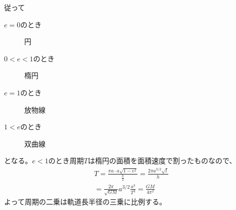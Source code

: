 	従って
	\begin{description}
		\item[$e = 0$のとき] 円
		\item[$0 < e < 1$のとき] 楕円
		\item[$e = 1$のとき] 放物線
		\item[$1 < e$のとき] 双曲線
	\end{description}
	となる。$e < 1$のとき周期$T$は楕円の面積を面積速度で割ったものなので、
	\begin{align}
		T = \frac{\pi a \cdot a\sqrt{1 - e^2}}{\frac{h}{2}}
		= \frac{2\pi a^{3/2}\sqrt{l}}{h}\\
		= \frac{2\pi}{\sqrt{GM}}a^{3/2}
		\frac{a^3}{T^2} = \frac{GM}{4\pi^2}
	\end{align}
	よって周期の二乗は軌道長半径の三乗に比例する。

